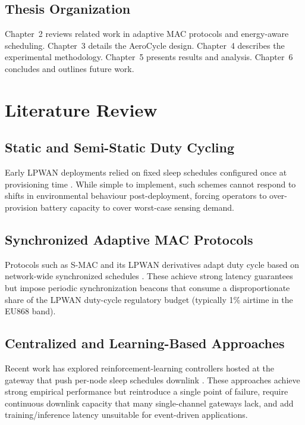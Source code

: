 \documentclass[12pt,a4paper]{report}
\begin{document}
\section{Thesis Organization}
Chapter~2 reviews related work in adaptive MAC protocols and energy-aware scheduling.
Chapter~3 details the AeroCycle design. Chapter~4 describes the experimental methodology.
Chapter~5 presents results and analysis. Chapter~6 concludes and outlines future work.

\chapter{Literature Review}
\label{ch:lit}

\section{Static and Semi-Static Duty Cycling}
Early LPWAN deployments relied on fixed sleep schedules configured once at provisioning
time \cite{bor2016lora}. While simple to implement, such schemes cannot respond to shifts in
environmental behaviour post-deployment, forcing operators to over-provision battery capacity
to cover worst-case sensing demand.

\section{Synchronized Adaptive MAC Protocols}
Protocols such as S-MAC and its LPWAN derivatives adapt duty cycle based on network-wide
synchronized schedules \cite{ye2004smac}. These achieve strong latency guarantees but impose
periodic synchronization beacons that consume a disproportionate share of the LPWAN duty-cycle
regulatory budget (typically 1\% airtime in the EU868 band).

\section{Centralized and Learning-Based Approaches}
Recent work has explored reinforcement-learning controllers hosted at the gateway that push
per-node sleep schedules downlink \cite{kim2020rl}. These approaches achieve strong empirical
performance but reintroduce a single point of failure, require continuous downlink capacity
that many single-channel gateways lack, and add training/inference latency unsuitable for
event-driven applications.
\end{document}
